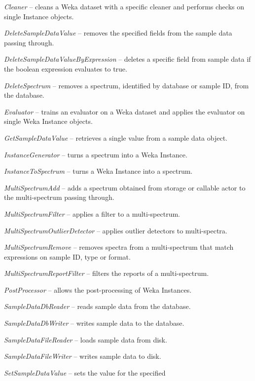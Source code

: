 \documentclass[a4paper]{book}
\begin{document}
\begin{tight_itemize}
  \item \textit{Cleaner} -- cleans a Weka dataset with a specific cleaner
  and performs checks on single Instance objects.
  \item \textit{DeleteSampleDataValue} -- removes the specified fields
  from the sample data passing through.
  \item \textit{DeleteSampleDataValueByExpression} -- deletes a specific
  field from sample data if the boolean expression evaluates to true.
  \item \textit{DeleteSpectrum} -- removes a spectrum, identified by
  database or sample ID, from the database.
  \item \textit{Evaluator} -- trains an evaluator on a Weka dataset and
  applies the evaluator on single Weka Instance objects.
  \item \textit{GetSampleDataValue} -- retrieves a single value from a
  sample data object.
  \item \textit{InstanceGenerator} -- turns a spectrum into a Weka Instance.
  \item \textit{InstanceToSpectrum} -- turns a Weka Instance into a spectrum.
  \item \textit{MultiSpectrumAdd} -- adds a spectrum obtained from storage or
  callable actor to the multi-spectrum passing through.
  \item \textit{MultiSpectrumFilter} -- applies a filter to a multi-spectrum.
  \item \textit{MultiSpectrumOutlierDetector} -- applies outlier detectors
  to multi-spectra.
  \item \textit{MultiSpectrumRemove} -- removes spectra from a multi-spectrum
  that match expressions on sample ID, type or format.
  \item \textit{MultiSpectrumReportFilter} -- filters the reports of a
  multi-spectrum.
  \item \textit{PostProcessor} -- allows the post-processing of Weka Instances.
  \item \textit{SampleDataDbReader} -- reads sample data from the database.
  \item \textit{SampleDataDbWriter} -- writes sample data to the database.
  \item \textit{SampleDataFileReader} -- loads sample data from disk.
  \item \textit{SampleDataFileWriter} -- writes sample data to disk.
  \item \textit{SetSampleDataValue} -- sets the value for the specified

\end{tight_itemize}
\end{document}
